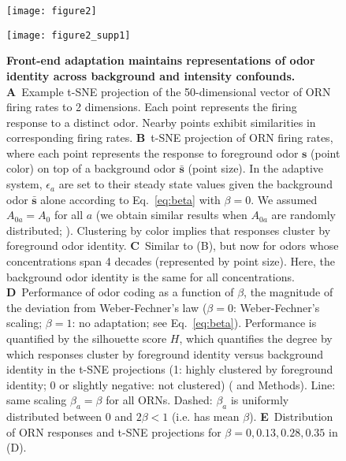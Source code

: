 \documentclass[9pt,lineno]{elife}
\begin{document}
\begin{figure}
	\begin{fullwidth}
	\texttt{[image: figure2]}
	\caption{\footnotesize{\textbf{Front-end adaptation maintains representations of odor identity across background and intensity confounds.}
			\textbf{A}~Example t-SNE projection of the 50-dimensional vector of ORN firing rates to 2 dimensions. Each point represents the firing response to a distinct odor. Nearby points exhibit similarities in corresponding firing rates.
			\textbf{B}~t-SNE projection of ORN firing rates, where each point represents the response to foreground odor $\mathbf{s}$ (point color) on top of a background odor $\bar{\mathbf{s}}$ (point size). In the adaptive system, $\epsilon_a$ are set to their steady state values given the background odor $\bar{\mathbf{s}}$ alone according to Eq.~\ref{eq:beta} with $\beta=0$. We assumed $A_{0a}=A_0$ for all $a$ (we obtain similar results when $A_{0a}$ are randomly distributed; ). Clustering by color implies that responses cluster by foreground odor identity.
			\textbf{C}~Similar to (B), but now for odors whose concentrations span 4 decades (represented by point size). Here, the background odor identity is the same for all concentrations. 
			{\color{blue} 
			\textbf{D}~Performance of odor coding as a function of $\beta$, the magnitude of the deviation from Weber-Fechner's law ($\beta=0$: Weber-Fechner's scaling; $\beta=1$: no adaptation; see Eq.~\ref{eq:beta}). Performance is quantified by the silhouette score $H$, which quantifies the degree by which responses cluster by foreground identity versus background identity in the t-SNE projections (1: highly clustered by foreground identity; 0 or slightly negative: not clustered) (\citep{silhouette_score} and Methods). Line: same scaling $\beta_a=\beta$ for all ORNs. Dashed: $\beta_a$ is uniformly distributed between 0 and $2\beta < 1$ (i.e. has mean $\beta$).
			\textbf{E}~Distribution of ORN responses and t-SNE projections for $\beta = 0, 0.13, 0.28, 0.35$ in (D). }}
			}
	\label{fig:coding}
		{\texttt{[image: figure2\_supp1]}}
		\label{figsupp:SI_coding}

\end{fullwidth}
\end{figure}
\end{document}
